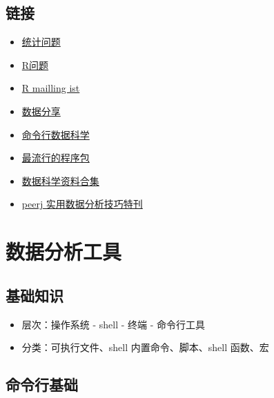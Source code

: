 \documentclass[]{book}
\providecommand{\tightlist}{%
  \setlength{\itemsep}{0pt}\setlength{\parskip}{0pt}}
\begin{document}
\section{链接}

\begin{itemize}
\tightlist
\item
  \href{https://stats.stackexchange.com/}{统计问题}
\item
  \href{http://stackoverflow.com/}{R问题}
\item
  \href{http://www.r-project.org/mail.html}{R mailling ist}
\item
  \href{http://figshare.com/}{数据分享}
\item
  \href{https://www.datascienceatthecommandline.com}{命令行数据科学}
\item
  \href{https://github.com/kaxap/arl}{最流行的程序包}
\item
  \href{https://github.com/bulutyazilim/awesome-datascience}{数据科学资料合集}
\item
  \href{https://peerj.com/collections/50-practicaldatascistats/}{peerj 实用数据分析技巧特刊}
\end{itemize}

\chapter{数据分析工具}

\section{基础知识}

\begin{itemize}
\tightlist
\item
  层次：操作系统 - shell - 终端 - 命令行工具
\item
  分类：可执行文件、shell 内置命令、脚本、shell 函数、宏
\end{itemize}

\section{命令行基础}
\end{document}
